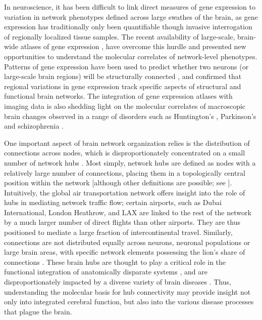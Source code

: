 In neuroscience, it has been difficult to link direct measures of gene expression to variation in network phenotypes defined across large swathes of the brain, as gene expression has traditionally only been quantifiable though invasive interrogation of regionally localized tissue samples.
The recent availability of large-scale, brain-wide atlases of gene expression \citep{Lein2007a,Hawrylycz2012}, have overcome this hurdle and presented new opportunities to understand the molecular correlates of network-level phenotypes. Patterns of gene expression have been used to predict whether two neurons (or large-scale brain regions) will be structurally connected \citep{Varadan2006,Kaufman2006,Baruch2008,Wolf2011,French2011,Ji2014,Fakhry2015a}, and confirmed that regional variations in gene expression track specific aspects of structural \citep{Goel2014,Forest2017,Parkes2017,Romero-Garcia2018} and functional \citep{Cioli2014b,Richiardi2015,Hawrylycz2015,Krienen2016,Anderson2018} brain networks. The integration of gene expression atlases with imaging data is also shedding light on the molecular correlates of macroscopic brain changes observed in a range of disorders such as Huntington’s \citep{McColgan2018}, Parkinson’s \citep{Rittman2016} and schizophrenia \citep{Romme2017}.

One important aspect of brain network organization relies is the distribution of connections across nodes, which is disproportionately concentrated on a small number of network hubs \citep{VandenHeuvel2011,Towlson2013}. Most simply, network hubs are defined as nodes with a relatively large number of connections, placing them in a topologically central position within the network [although other definitions are possible; see \citep{Power2011,Oldham}].
Intuitively, the global air transportation network offers insight into the role of hubs in mediating network traffic flow; certain airports, such as Dubai International, London Heathrow, and LAX are linked to the rest of the network by a much larger number of direct flights than other airports. They are thus positioned to mediate a large fraction of intercontinental travel. Similarly, connections are not distributed equally across neurons, neuronal populations or large brain areas, with specific network elements possessing the lion’s share of connections \citep{VandenHeuvel2011,Towlson2013,DeReus2014,VandenHeuvel2016}.
These brain hubs are thought to play a critical role in the functional integration of anatomically disparate systems \citep{Harriger2012,VandenHeuvel2012}, and are disproportionately impacted by a diverse variety of brain diseases \citep{Crossley2014,Fornito2015}. Thus, understanding the molecular basis for hub connectivity may provide insight not only into integrated cerebral function, but also into the various disease processes that plague the brain.

